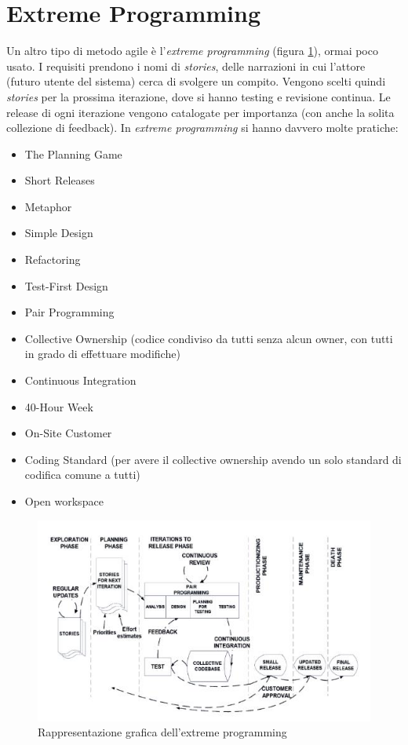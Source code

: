 \documentclass[a4paper,12pt, oneside]{book}
\begin{document}
\section{Extreme Programming}
Un altro tipo di metodo agile è l'\textit{extreme programming} (figura
\ref{extreme}), ormai poco usato. I requisiti prendono i nomi di
\textit{stories}, delle narrazioni in cui l'attore (futuro utente del sistema) cerca 
di svolgere un compito. Vengono
scelti quindi \textit{stories} per la prossima iterazione, dove si hanno testing
e revisione continua. Le release di ogni iterazione vengono catalogate per
importanza (con anche la solita collezione di feedback). In \textit{extreme
  programming} si hanno davvero molte pratiche:
\begin{itemize}
  \item The Planning Game
  \item Short Releases
  \item Metaphor
  \item Simple Design
  \item Refactoring
  \item Test-First Design
  \item Pair Programming
  \item Collective Ownership (codice condiviso da tutti senza alcun owner, con
  tutti in grado di effettuare modifiche)
  \item Continuous Integration
  \item 40-Hour Week
  \item On-Site Customer
  \item Coding Standard (per avere il collective ownership avendo un solo
  standard di codifica comune a tutti)
  \item Open workspace
\end{itemize}
\begin{figure}
  \centering
  \includegraphics[scale = 0.7]{img/extreme.jpg}
  \caption{Rappresentazione grafica dell'extreme programming}
  \label{extreme}
\end{figure}
\end{document}
